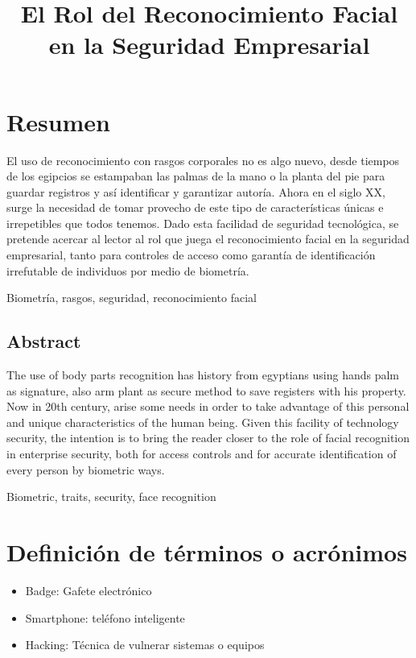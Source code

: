 \documentclass[conference]{IEEEtran}
\begin{document}
\title{El Rol del Reconocimiento Facial en la Seguridad Empresarial\\
{\footnotesize }
}
\maketitle



\section{Resumen}
El uso de reconocimiento con rasgos corporales no es algo nuevo, desde tiempos de los egipcios se estampaban las palmas de la mano o la planta del pie para guardar registros y así identificar y garantizar autoría. Ahora en el siglo XX, surge la necesidad de tomar provecho de este tipo de características únicas e irrepetibles que todos tenemos.
Dado esta facilidad de seguridad tecnológica, se pretende acercar al lector al rol que juega el reconocimiento facial en la seguridad empresarial, tanto para controles de acceso como garantía de identificación irrefutable de individuos por medio de biometría. 
\begin{IEEEkeywords}
Biometría, rasgos, seguridad, reconocimiento facial
\end{IEEEkeywords}

\subsection{Abstract}
The use of body parts recognition has history from egyptians using hands palm as signature, also arm plant as secure method to save registers with his property. Now in 20th century, arise some needs in order to take advantage of this personal and unique characteristics of the human being. Given this facility of technology security, the intention is to bring the reader closer to the role of facial recognition in enterprise security, both for access controls and for accurate identification of every person by biometric ways.

\begin{IEEEkeywords}
Biometric, traits, security, face recognition
\end{IEEEkeywords}

\section{Definición de términos o acrónimos}
\begin{itemize}
\item Badge: Gafete electrónico 
\item Smartphone: teléfono inteligente
\item Hacking: Técnica de vulnerar sistemas o equipos
\end{itemize}
\end{document}
